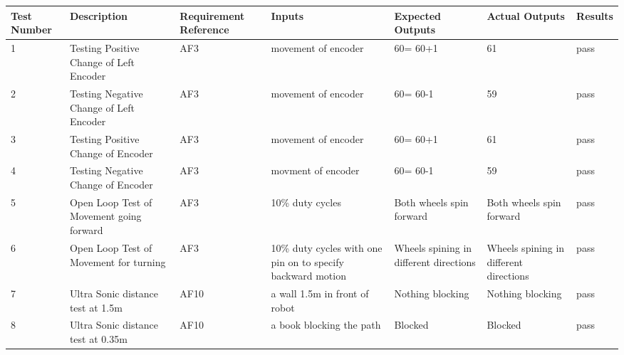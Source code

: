 \documentclass [10pt]{article}
\begin{document}
	\begin{longtable}{| p{} | p{} | p{} | p{} | p{} | p{} | p{} |}\hline 
		\rowcolor{tableCell}\textbf{Test Number} & \textbf{Description} & \textbf{Requirement Reference} & \textbf{Inputs} & \textbf{Expected Outputs} & \textbf{Actual Outputs}& \textbf{Results} \\ \hline

		1 &  Testing Positive Change of Left Encoder & AF3 & movement of encoder &  60= 60+1 &  61 &   pass \\ \hline
		2 &  Testing Negative Change of Left Encoder & AF3 & movement of encoder &  60= 60-1 &  59 &   pass
		\\ \hline
		3 &  Testing Positive Change of Encoder &  AF3 &  movement of encoder &  60= 60+1 &  61 &   pass
		\\  \hline
		4 &  Testing Negative Change of Encoder &  AF3 &  movment of encoder &  60= 60-1 &  59 &   pass
		\\ \hline 
		5 &  Open Loop Test of Movement going forward &  AF3 &  10\% duty cycles &  Both wheels spin forward &  Both wheels spin forward &   pass
		\\ \hline
		6 &  Open Loop Test of Movement for turning &  AF3 & 10\% duty cycles with one pin on to specify backward motion &  Wheels spining in different directions &  Wheels spining in different directions &   pass
		\\ \hline
		7 &  Ultra Sonic distance test at 1.5m &  AF10 &  a wall 1.5m in front of robot &  Nothing blocking &  Nothing blocking &   pass
		\\ \hline
		8 &  Ultra Sonic distance test at 0.35m &  AF10 & a book blocking the path &  Blocked &  Blocked &   pass
		\\ \hline
	

\end{longtable}
\end{document}
